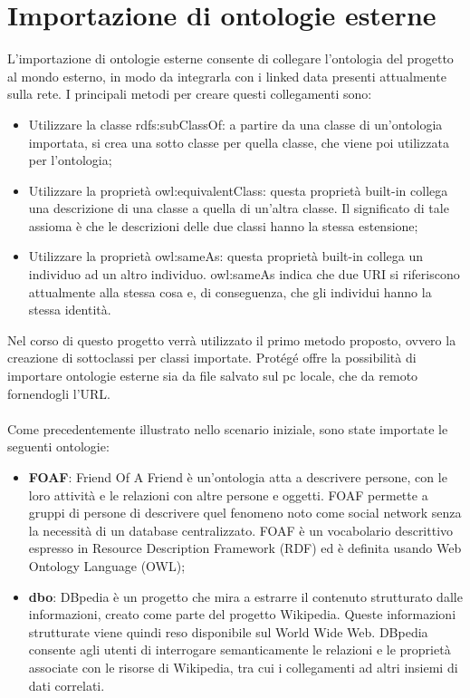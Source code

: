 \section{Importazione di ontologie esterne}
L'importazione di ontologie esterne consente di collegare l'ontologia del progetto al mondo esterno, in modo da integrarla con i linked data presenti attualmente sulla rete. I principali metodi per creare questi collegamenti sono:
\begin{itemize}
\item Utilizzare la classe rdfs:subClassOf: a partire da una classe di un'ontologia importata, si crea una sotto classe per quella classe, che viene poi utilizzata per l'ontologia; 
\item Utilizzare la proprietà owl:equivalentClass: questa proprietà built-in collega una descrizione di una classe a quella di un’altra classe. Il significato di tale assioma è che le descrizioni delle due classi hanno la stessa estensione;
\item Utilizzare la proprietà owl:sameAs: questa proprietà built-in collega un individuo ad un altro individuo. owl:sameAs indica che due URI si riferiscono attualmente alla stessa cosa e, di conseguenza, che gli individui hanno la stessa identità.
\end{itemize}
Nel corso di questo progetto verrà utilizzato il primo metodo proposto, ovvero la creazione di sottoclassi per classi importate. Protégé offre la possibilità di importare ontologie esterne sia da file salvato sul pc locale, che da remoto fornendogli l'URL.
\\\\
Come precedentemente illustrato nello scenario iniziale, sono state importate le seguenti ontologie: 
\begin{itemize}
\item \textbf{FOAF}: Friend Of A Friend è un'ontologia atta a descrivere persone, con le loro attività e le relazioni con altre persone e oggetti. FOAF permette a gruppi di persone di descrivere quel fenomeno noto come social network senza la necessità di un database centralizzato. FOAF è un vocabolario descrittivo espresso in Resource Description Framework (RDF) ed è definita usando Web Ontology Language (OWL);
\item \textbf{dbo}: DBpedia è un progetto che mira a estrarre il contenuto strutturato dalle informazioni, creato come parte del progetto Wikipedia. Queste informazioni strutturate viene quindi reso disponibile sul World Wide Web. DBpedia consente agli utenti di interrogare semanticamente le relazioni e le proprietà associate con le risorse di Wikipedia, tra cui i collegamenti ad altri insiemi di dati correlati.
\end{itemize}
